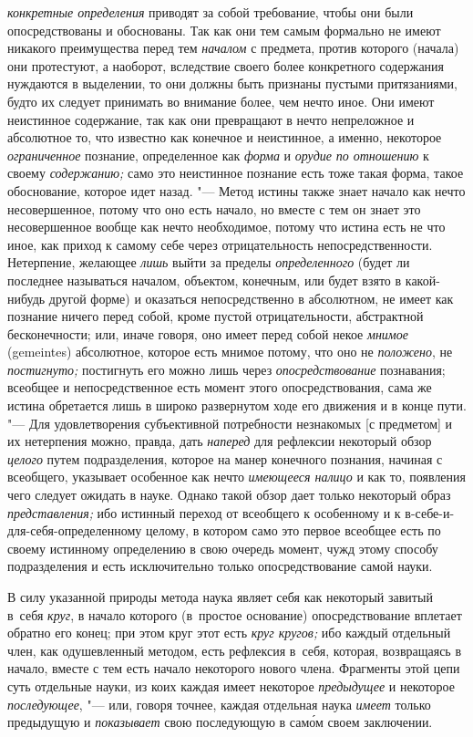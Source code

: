 {\em конкретные определения}
приводят за собой требование, чтобы они были опосредствованы
и обоснованы. Так как они тем самым формально не имеют никакого
преимущества перед тем {\em началом}
с предмета, против которого (начала) они протестуют, а
наоборот, вследствие своего более конкретного содержания нуждаются в
выделении, то они должны быть признаны пустыми притязаниями, будто их
следует принимать во внимание более, чем нечто иное. Они имеют
неистинное содержание, так как они превращают в нечто непреложное и
абсолютное то, что известно как конечное и неистинное, а именно, некоторое
{\em ограниченное} познание, определенное как {\em форма} и {\em орудие}
{\em по отношению} к своему {\em содержанию;}
само это неистинное познание есть тоже такая форма, такое
обоснование, которое идет назад. "--- Метод истины также знает
начало как нечто несовершенное, потому что оно есть начало, но вместе с тем
он знает это несовершенное вообще как нечто необходимое,
потому что истина есть не что иное, как приход к самому себе через
отрицательность непосредственности. Нетерпение, желающее
{\em лишь} выйти за пределы {\em определенного}
(будет ли последнее называться началом, объектом, конечным,
или будет взято в какой-нибудь другой форме) и оказаться непосредственно в
абсолютном, не имеет как познание ничего перед собой, кроме пустой
отрицательности, абстрактной бесконечности; или, иначе говоря, оно имеет
перед собой некое {\em мнимое} (gemeintes) абсолютное, которое есть мнимое
потому, что оно не {\em положено}, не {\em постигнуто;}
постигнуть его можно лишь через {\em опосредствование}
познавания; всеобщее и непосредственное есть момент этого
опосредствования, сама же истина обретается лишь в широко развернутом ходе
его движения и в конце пути. "--- Для удовлетворения
субъективной потребности незнакомых [с предметом] и их нетерпения можно,
правда, дать {\em наперед} для рефлексии некоторый обзор {\em целого} путем
подразделения, которое на манер конечного познания, начиная с всеобщего,
указывает особенное как нечто {\em имеющееся налицо} и
как то, появления чего следует ожидать в науке. Однако такой обзор дает
только некоторый образ {\em представления;} ибо
истинный переход от всеобщего к особенному и к
в-себе-и-для-себя-определенному целому, в котором само это первое всеобщее
есть по своему истинному определению в свою очередь момент, чужд этому
способу подразделения и есть исключительно только опосредствование самой науки.

В силу указанной природы метода наука являет себя как некоторый завитый в~себя
{\em круг}, в начало которого (в~простое основание) опосредствование вплетает
обратно его конец; при этом круг этот есть {\em круг кругов;} ибо каждый
отдельный член, как одушевленный методом, есть рефлексия в~себя, которая,
возвращаясь в начало, вместе с тем есть начало некоторого нового члена.
Фрагменты этой цепи суть отдельные науки, из коих каждая имеет некоторое
{\em предыдущее} и некоторое {\em последующее}, "--- или, говоря точнее,
каждая отдельная наука {\em имеет} только предыдущую и {\em показывает}
свою последующую в сам\'{о}м своем заключении.


